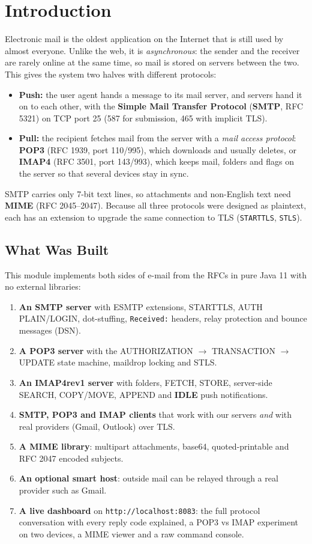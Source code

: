 \documentclass[11pt,a4paper]{article}
\begin{document}
\section{Introduction}
\noindent Electronic mail is the oldest application on the Internet that is still used by almost everyone. Unlike the web, it is \emph{asynchronous}: the sender and the receiver are rarely online at the same time, so mail is stored on servers between the two. This gives the system two halves with different protocols:
\begin{itemize}[leftmargin=2em]
    \item \textbf{Push:} the user agent hands a message to its mail server, and servers hand it on to each other, with the \textbf{Simple Mail Transfer Protocol} (\textbf{SMTP}, RFC 5321) on TCP port 25 (587 for submission, 465 with implicit TLS).
    \item \textbf{Pull:} the recipient fetches mail from the server with a \emph{mail access protocol}: \textbf{POP3} (RFC 1939, port 110/995), which downloads and usually deletes, or \textbf{IMAP4} (RFC 3501, port 143/993), which keeps mail, folders and flags on the server so that several devices stay in sync.
\end{itemize}
SMTP carries only 7-bit text lines, so attachments and non-English text need \textbf{MIME} (RFC 2045--2047). Because all three protocols were designed as plaintext, each has an extension to upgrade the same connection to TLS (\texttt{STARTTLS}, \texttt{STLS}).

\subsection{What Was Built}
This module implements both sides of e-mail from the RFCs in pure Java 11 with no external libraries:
\begin{enumerate}[leftmargin=2em]
    \item \textbf{An SMTP server} with ESMTP extensions, STARTTLS, AUTH PLAIN/LOGIN, dot-stuffing, \texttt{Received:} headers, relay protection and bounce messages (DSN).
    \item \textbf{A POP3 server} with the AUTHORIZATION $\rightarrow$ TRANSACTION $\rightarrow$ UPDATE state machine, maildrop locking and STLS.
    \item \textbf{An IMAP4rev1 server} with folders, FETCH, STORE, server-side SEARCH, COPY/MOVE, APPEND and \textbf{IDLE} push notifications.
    \item \textbf{SMTP, POP3 and IMAP clients} that work with our servers \emph{and} with real providers (Gmail, Outlook) over TLS.
    \item \textbf{A MIME library}: multipart attachments, base64, quoted-printable and RFC 2047 encoded subjects.
    \item \textbf{An optional smart host}: outside mail can be relayed through a real provider such as Gmail.
    \item \textbf{A live dashboard} on \texttt{http://localhost:8083}: the full protocol conversation with every reply code explained, a POP3 vs IMAP experiment on two devices, a MIME viewer and a raw command console.
\end{enumerate}
\end{document}
